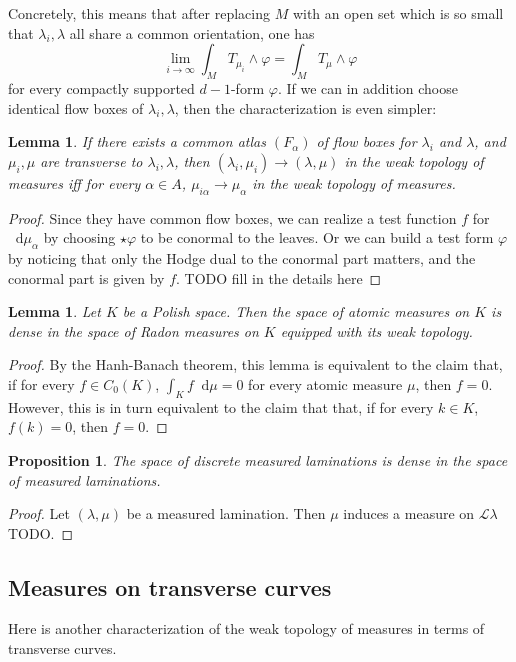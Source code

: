 \documentclass[reqno,10pt]{amsart}
\newcommand*\dif{\mathop{}\!\mathrm{d}}
\newcommand{\Leaves}{\mathscr L}
\newtheorem{lemma}[theorem]{Lemma}
\newtheorem{proposition}[theorem]{Proposition}
\theoremstyle{definition}
\numberwithin{equation}{section}
\begin{document}
Concretely, this means that after replacing $M$ with an open set which is so small that $\lambda_i, \lambda$ all share a common orientation, one has
$$\lim_{i \to \infty} \int_M T_{\mu_i} \wedge \varphi = \int_M T_\mu \wedge \varphi$$
for every compactly supported $d-1$-form $\varphi$.
If we can in addition choose identical flow boxes of $\lambda_i, \lambda$, then the characterization is even simpler:

\begin{lemma}
If there exists a common atlas $(F_\alpha)$ of flow boxes for $\lambda_i$ and $\lambda$, and $\mu_i, \mu$ are transverse to $\lambda_i, \lambda$, then $(\lambda_i, \mu_i) \to (\lambda, \mu)$ in the weak topology of measures iff for every $\alpha \in A$, $\mu_{i\alpha} \to \mu_\alpha$ in the weak topology of measures.
\end{lemma}
\begin{proof}
Since they have common flow boxes, we can realize a test function $f$ for $\dif \mu_\alpha$ by choosing $\star \varphi$ to be conormal to the leaves.
Or we can build a test form $\varphi$ by noticing that only the Hodge dual to the conormal part matters, and the conormal part is given by $f$.
TODO fill in the details here
\end{proof}

\begin{lemma}
Let $K$ be a Polish space.
Then the space of atomic measures on $K$ is dense in the space of Radon measures on $K$ equipped with its weak topology.
\end{lemma}
\begin{proof}
By the Hanh-Banach theorem, this lemma is equivalent to the claim that, if for every $f \in C_0(K)$, $\int_K f \dif \mu = 0$ for every atomic measure $\mu$, then $f = 0$.
However, this is in turn equivalent to the claim that that, if for every $k \in K$, $f(k) = 0$, then $f = 0$.
\end{proof}

\begin{proposition}
The space of discrete measured laminations is dense in the space of measured laminations.
\end{proposition}
\begin{proof}
Let $(\lambda, \mu)$ be a measured lamination. Then $\mu$ induces a measure on $\Leaves \lambda$ TODO.
\end{proof}


\subsection{Measures on transverse curves}
Here is another characterization of the weak topology of measures in terms of transverse curves.
\end{document}
